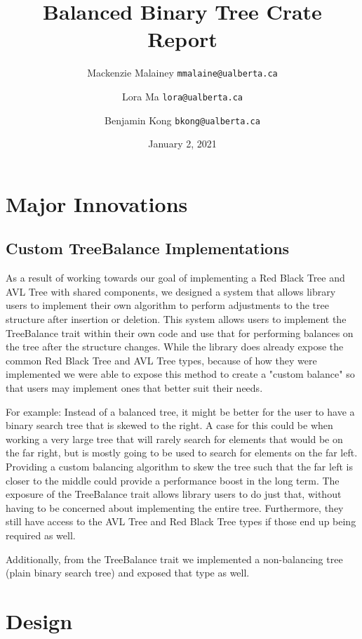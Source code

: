 \documentclass[12pt, letterpaper]{article}
\title{Balanced Binary Tree Crate Report}
\author{
    Mackenzie Malainey
    \texttt{mmalaine@ualberta.ca}
    \and
    Lora Ma
    \texttt{lora@ualberta.ca}
    \and
    Benjamin Kong
    \texttt{bkong@ualberta.ca}
}
\date{January 2, 2021}
\begin{document}
\maketitle

\newpage
\tableofcontents
\newpage

\section{Major Innovations}

\subsection{Custom TreeBalance Implementations}
As a result of working towards our goal of implementing a Red Black Tree and AVL Tree with shared components,
we designed a system that allows library users to implement their own algorithm to perform adjustments
to the tree structure after insertion or deletion.  This system allows users to implement the TreeBalance
trait within their own code and use that for performing balances on the tree after the structure changes.
While the library does already expose the common Red Black Tree and AVL Tree types, because of how they were implemented
we were able to expose this method to create a "custom balance" so that users may implement ones that better suit their needs.

For example:
Instead of a balanced tree, it might be better for the user to have a binary search tree that is skewed to the right.
A case for this could be when working a very large tree that will rarely search for elements that would be on the far right,
but is mostly going to be used to search for elements on the far left.  Providing a custom balancing algorithm to skew the tree
such that the far left is closer to the middle could provide a performance boost in the long term.  The exposure of the
TreeBalance trait allows library users to do just that, without having to be concerned about implementing the entire tree.
Furthermore, they still have access to the AVL Tree and Red Black Tree types if those end up being required as well.

Additionally, from the TreeBalance trait we implemented a non-balancing tree (plain binary search tree) and exposed that type as well.

\newpage
\section{Design}
\end{document}
